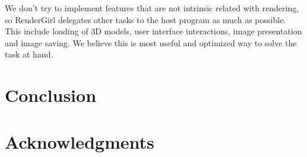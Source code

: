 \documentclass[a4paper]{sbgames}               %
\begin{document}
We don't try to implement features that are not intrinsic related with
rendering, so RenderGirl delegates other tasks to the host program as
much as possible. This include loading of 3D models, user interface
interactions, image presentation and image saving. We believe this is
most useful and optimized way to solve the task at hand.

\section{Conclusion}
\label{sec:conclusion}

\section*{Acknowledgments}




\end{document}
